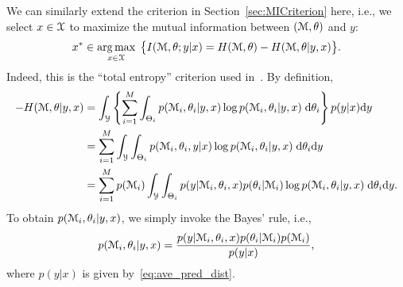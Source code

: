 \documentclass[11pt]{article}
\numberwithin{equation}{section}
\begin{document}
We can similarly extend the criterion in Section~\ref{sec:MICriterion} here, i.e.,  we select $x\in\mathcal{X}$ to maximize the mutual information between $(\mathcal{M},\theta)$ and $y$: %
\begin{align}
x^*\in\operatorname*{arg\,max}_{x\in\mathcal{X}} \;\big\{I(\mathcal{M},\theta;y|x) = H(\mathcal{M},\theta) - H(\mathcal{M},\theta|y,x)\big\}. 
\end{align}
Indeed, this is the ``total entropy'' criterion used in~\cite{Borth_75}. 
By definition,
\begin{align*}
- H(\calM,\theta|y,x) &= \int_{\calY}\left\{\sum_{i=1}^M \int_{\Theta_i} p(\calM_i,\theta_i|y,x) \log p(\calM_i,\theta_i|y,x)\;\rmd\theta_i\right\} p(y|x) \rmd y\\
&= \sum_{i=1}^M \int_{\calY}\int_{\Theta_i} p(\calM_i,\theta_i,y|x) \log p(\calM_i,\theta_i|y,x) \;\rmd\theta_i \rmd y\\
&= \sum_{i=1}^M p(\calM_i)\int_{\calY}\int_{\Theta_i} p(y|\calM_i,\theta_i,x) p(\theta_i|\calM_i) \log p(\calM_i,\theta_i|y,x) \;\rmd \theta_i \rmd y.%
\end{align*}
To obtain $p(\mathcal{M}_i,\theta_i|y,x)$, we simply invoke the Bayes' rule, i.e.,
\begin{equation}
p(\mathcal{M}_i,\theta_i|y,x) = \frac{p(y|\mathcal{M}_i,\theta_i,x)p(\theta_i|\mathcal{M}_i)p(\mathcal{M}_i)}{p(y|x)},
\end{equation}
where $p(y|x)$ is given by~\eqref{eq:ave_pred_dist}. 
\end{document}
